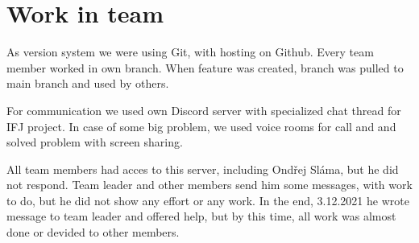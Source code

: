 \documentclass[11pt]{article}
\begin{document}
\section{Work in team}
As version system we were using Git, with hosting on Github. Every team member worked in own branch. When feature was created, branch was
pulled to main branch and used by others.

For communication we used own Discord server with specialized chat thread for IFJ project. In case of some big problem, we used voice rooms for call and
and solved problem with screen sharing.

All team members had acces to this server, including Ondřej Sláma, but he did not respond. Team leader and other members send him some messages, with work to do, but he did not 
show any effort or any work. In the end, 3.12.2021 he wrote message to team leader and offered help, but by this time, all work was almost done or devided to 
other members. 
\end{document}

